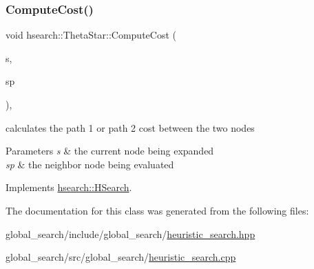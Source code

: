 \subsubsection{\texorpdfstring{Compute\+Cost()}{ComputeCost()}}
{\footnotesize\ttfamily void hsearch\+::\+Theta\+Star\+::\+Compute\+Cost (\begin{DoxyParamCaption}\item[{\hyperlink{structhsearch_1_1SearchNode}{Search\+Node} \&}]{s,  }\item[{\hyperlink{structhsearch_1_1SearchNode}{Search\+Node} \&}]{sp }\end{DoxyParamCaption})\hspace{0.3cm}{\ttfamily [protected]}, {\ttfamily [virtual]}}



calculates the path 1 or path 2 cost between the two nodes 


\begin{DoxyParams}{Parameters}
{\em s} & the current node being expanded \\
\hline
{\em sp} & the neighbor node being evaluated \\
\hline
\end{DoxyParams}


Implements \hyperlink{classhsearch_1_1HSearch_a5d325955c4faedaca0c68155fd1f7e69}{hsearch\+::\+H\+Search}.



The documentation for this class was generated from the following files\+:\begin{DoxyCompactItemize}
\item 
global\+\_\+search/include/global\+\_\+search/\hyperlink{heuristic__search_8hpp}{heuristic\+\_\+search.\+hpp}\item 
global\+\_\+search/src/global\+\_\+search/\hyperlink{heuristic__search_8cpp}{heuristic\+\_\+search.\+cpp}\end{DoxyCompactItemize}
